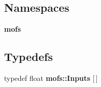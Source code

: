 \subsection*{Namespaces}
\begin{DoxyCompactItemize}
\item 
{\bf mofs}
\end{DoxyCompactItemize}
\subsection*{Typedefs}
\begin{DoxyCompactItemize}
\item 
typedef float {\bf mofs\-::\-Inputs} [$\,$]
\end{DoxyCompactItemize}
